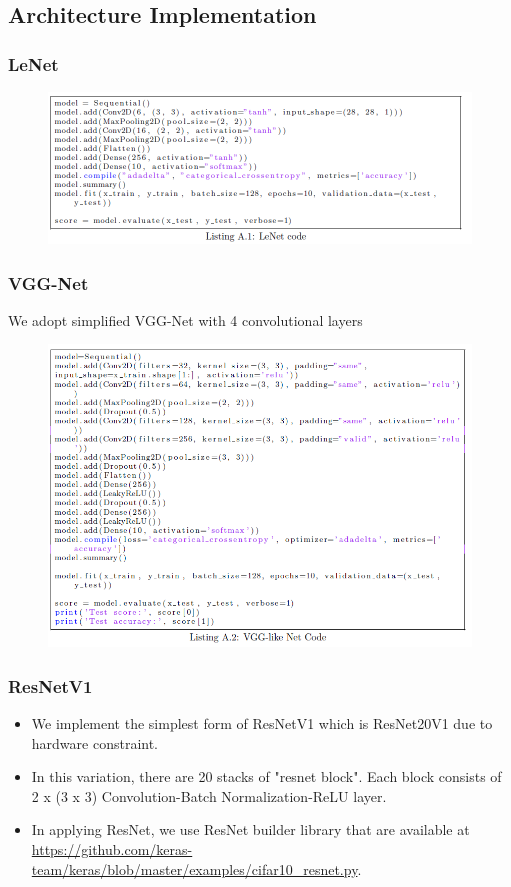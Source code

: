 \documentclass{beamer}
\begin{document}
\subsection{Architecture Implementation}
\begin{frame}\frametitle{LeNet}
\begin{figure}[h]
	\includegraphics[scale=0.5]{figures/lenet_code}
	\centering
	\label{fig:lenet_arch}
\end{figure}

\end{frame}
\begin{frame}\frametitle{VGG-Net}
We adopt simplified VGG-Net with 4 convolutional layers 
\begin{figure}[h]
	\includegraphics[scale=0.4]{figures/vggnet_code}
	\centering
	\label{fig:vggnet_arch}
\end{figure}
\end{frame}
\begin{frame}\frametitle{ResNetV1}
\begin{itemize}
	\item We implement the simplest form of ResNetV1 which is ResNet20V1 due to hardware constraint.   
	\item In this variation, there are 20 stacks of "resnet block". Each block consists of 2 x (3 x 3) Convolution-Batch Normalization-ReLU layer.
	\item In applying ResNet, we use ResNet builder library that are available at \href{https://github.com/keras-team/keras/blob/master/examples/cifar10\_resnet.py}{https://github.com/keras-team/keras/blob/master/examples/cifar10\_resnet.py}.
\end{itemize} 
\end{frame}
\end{document}
